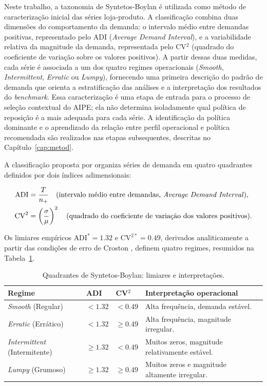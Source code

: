 Neste trabalho, a taxonomia de Syntetos-Boylan é utilizada como método de caracterização inicial das séries loja-produto. A classificação combina duas dimensões do comportamento da demanda: o intervalo médio entre demandas positivas, representado pelo ADI (\textit{Average Demand Interval}), e a variabilidade relativa da magnitude da demanda, representada pelo CV$^2$ (quadrado do coeficiente de variação sobre os valores positivos). A partir dessas duas medidas, cada série é associada a um dos quatro regimes operacionais (\textit{Smooth}, \textit{Intermittent}, \textit{Erratic} ou \textit{Lumpy}), fornecendo uma primeira descrição do padrão de demanda que orienta a estratificação das análises e a interpretação dos resultados do \textit{benchmark}. Essa caracterização é uma etapa de entrada para o processo de seleção contextual do AIPE; ela não determina isoladamente qual política de reposição é a mais adequada para cada série. A identificação da política dominante e o aprendizado da relação entre perfil operacional e política recomendada são realizados nas etapas subsequentes, descritas no Capítulo~\ref{cap:metod}.

A classificação proposta por \citet{Syntetos2005Categorization} organiza séries de demanda em quatro quadrantes definidos por dois índices adimensionais:

\begin{align}
  \text{ADI} &= \frac{T}{n_{+}} \quad (\text{intervalo médio entre demandas, \textit{Average Demand Interval}}), \label{eq:adi} \\
  \text{CV}^2 &= \left(\frac{\sigma}{\mu}\right)^2 \quad (\text{quadrado do coeficiente de variação dos valores positivos}). \label{eq:cv2}
\end{align}

Os limiares empíricos $\text{ADI}^* = 1.32$ e $\text{CV}^{2*} = 0.49$, derivados analiticamente a partir das condições de erro de Croston \citep{Syntetos2005Categorization}, definem quatro regimes, resumidos na Tabela~\ref{tab:sb_quad}.

\begin{table}[htbp]
\centering
\small
\renewcommand{\arraystretch}{1.2}
\caption{Quadrantes de Syntetos-Boylan: limiares e interpretações.}
\label{tab:sb_quad}
\begin{tabular}{llll}
\toprule
Regime & ADI & CV$^2$ & Interpretação operacional \\
\midrule
\textit{Smooth} (Regular) & $< 1.32$ & $< 0.49$ & Alta frequência, demanda estável. \\
\textit{Erratic} (Errático) & $< 1.32$ & $\geq 0.49$ & Alta frequência, magnitude irregular. \\
\textit{Intermittent} (Intermitente) & $\geq 1.32$ & $< 0.49$ & Muitos zeros, magnitude relativamente estável. \\
\textit{Lumpy} (Grumoso) & $\geq 1.32$ & $\geq 0.49$ & Muitos zeros e magnitude altamente irregular. \\
\bottomrule
\end{tabular}
\end{table}

